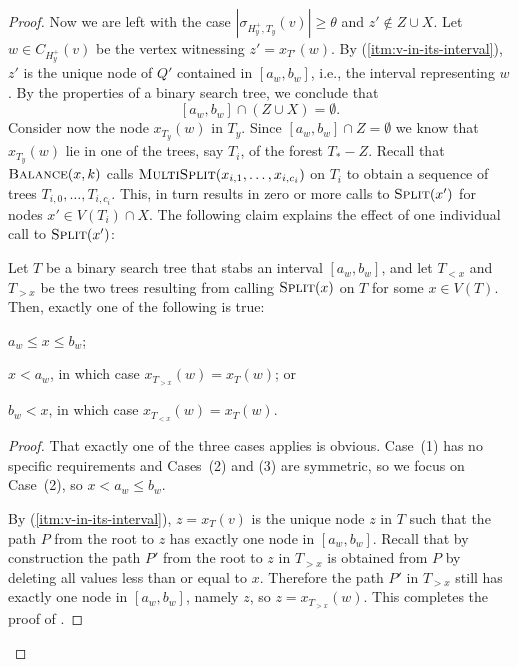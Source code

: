 \documentclass[kpfonts]{patmorin}
\let\le\leqslant
\let\geq\geqslant
\begin{document}
\begin{proof}
  Now we are left with the case $|\sigma_{H^+_{y},T_{y}}(v)| \geq \theta$ and $z'\not\in Z\cup X$. 
  Let $w \in C_{H^+_y}(v)$ be the vertex witnessing $z' = x_{T'}(w)$.
  By (\ref{itm:v-in-its-interval}), 
  $z'$ is the unique node of $Q'$ contained in $[a_w,b_w]$, i.e., the interval representing $w$. 
  By the properties of a binary search tree, we conclude that
  \[
  [a_w,b_w]\cap (Z\cup X)=\emptyset.
  \]
  Consider now the node $x_{T_y}(w)$ in $T_y$. Since $[a_w,b_w]\cap Z=\emptyset$ we know that $x_{T_y}(w)$ lie in one of the trees, say $T_i$, of the forest $T_*-Z$.
  Recall that $\textsc{Balance}(x,k)$ calls $\textsc{MultiSplit}(x_{i,1},\dots,x_{i,c_i})$ on $T_{i}$ to obtain a sequence of trees $T_{i,0},\dots,T_{i,c_i}$. 
  This, in turn results in zero or more calls to $\textsc{Split}(x')$ for nodes $x'\in V(T_{i})\cap X$. The following claim explains the effect of one individual call to $\textsc{Split}(x')$:

  \begin{clm}
    Let $T$ be a binary search tree that stabs an interval $[a_w,b_w]$, 
    and let $T_{<x}$ and $T_{>x}$ be the two trees resulting from calling $\textsc{Split}(x)$ on $T$ for some $x\in V(T)$. Then, exactly one of the following is true:
    \begin{compactenum}
      \item $a_w\le x\le b_w$;
      \item $x< a_w$, in which case $x_{T_{>x}}(w)=x_T(w)$; or
      \item $b_w < x$, in which case $x_{T_{<x}}(w)=x_T(w)$.
    \end{compactenum}
  \end{clm}
  \begin{proof}
    That exactly one of the three cases applies is obvious.  Case~(1) has no specific requirements and Cases~(2) and (3) are symmetric, so we focus on Case~(2), so $x < a_w\le b_w$.

    By (\ref{itm:v-in-its-interval}), $z=x_T(v)$ is the unique node $z$ in $T$ such that the path $P$ from the root to $z$ has exactly one node in $[a_w,b_w]$. 
    Recall that by construction 
    the path $P'$ from the root to $z$ in $T_{>x}$ is obtained from $P$ 
    by deleting all values less than or equal to $x$. 
    Therefore the path $P'$ in $T_{>x}$ still has exactly one node in $[a_w,b_w]$, namely $z$, 
    so $z=x_{T_{>x}}(w)$. This completes the proof of .
  \end{proof}


\end{proof}
\end{document}
